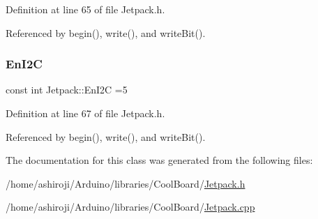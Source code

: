 Definition at line 65 of file Jetpack.\+h.



Referenced by begin(), write(), and write\+Bit().

\mbox{\label{classJetpack_a81df984fb4cea98c71aa1a1cfcdfe814}} 
\subsubsection{\texorpdfstring{En\+I2C}{EnI2C}}
{\footnotesize\ttfamily const int Jetpack\+::\+En\+I2C =5\hspace{0.3cm}{\ttfamily [private]}}



Definition at line 67 of file Jetpack.\+h.



Referenced by begin(), write(), and write\+Bit().



The documentation for this class was generated from the following files\+:\begin{DoxyCompactItemize}
\item 
/home/ashiroji/\+Arduino/libraries/\+Cool\+Board/\hyperlink{Jetpack_8h}{Jetpack.\+h}\item 
/home/ashiroji/\+Arduino/libraries/\+Cool\+Board/\hyperlink{Jetpack_8cpp}{Jetpack.\+cpp}\end{DoxyCompactItemize}
